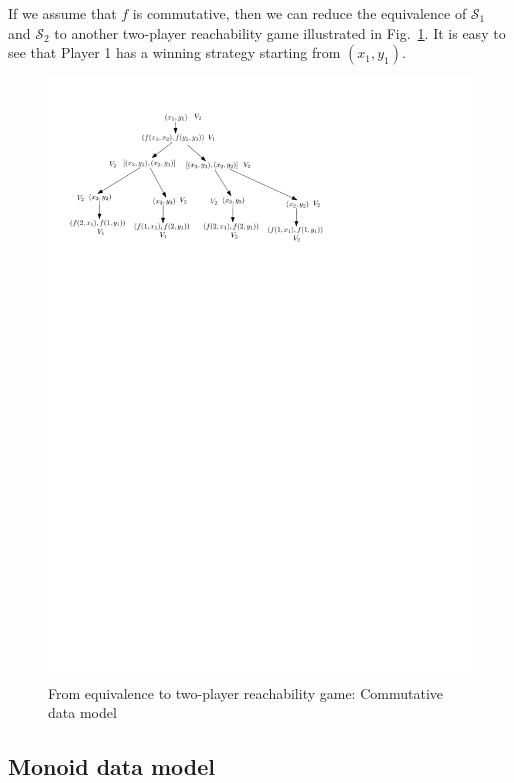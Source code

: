 \documentclass[runningheads,a4paper]{llncs}
\newcommand\Ss{\mathcal{S}}
\begin{document}
If we assume that $f$ is commutative, then we can reduce the equivalence of $\Ss_1$ and $\Ss_2$ to another two-player reachability game illustrated in Fig.~\ref{fig-equiv-to-game-com}. It is easy to see that Player 1 has a winning strategy starting from $(x_1, y_1)$.
\begin{figure}[h]
\begin{center}
\includegraphics[scale=0.9]{game-com.pdf}
\end{center}
\caption{From equivalence to two-player reachability game: Commutative data model}\label{fig-equiv-to-game-com}
\end{figure}


\subsection{Monoid data model}
\end{document}
